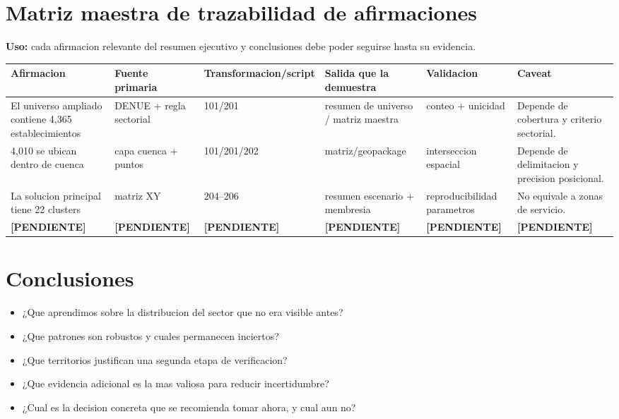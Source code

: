 \documentclass[11pt,letterpaper]{article}
\newcommand{\pendiente}{\textcolor{AtoyacRed}{\textbf{[PENDIENTE]}}}
\begin{document}
\section{Matriz maestra de trazabilidad de afirmaciones}

\textbf{Uso:} cada afirmacion relevante del resumen ejecutivo y conclusiones debe poder seguirse hasta su evidencia.

\begin{landscape}
\small
\begin{longtable}{p{}p{}p{}p{}p{}p{}}
\toprule
\textbf{Afirmacion} & \textbf{Fuente primaria} & \textbf{Transformacion/script} & \textbf{Salida que la demuestra} & \textbf{Validacion} & \textbf{Caveat} \\
\midrule
El universo ampliado contiene 4,365 establecimientos & DENUE + regla sectorial & 101/201 & resumen de universo / matriz maestra & conteo + unicidad & Depende de cobertura y criterio sectorial. \\
4,010 se ubican dentro de cuenca & capa cuenca + puntos & 101/201/202 & matriz/geopackage & interseccion espacial & Depende de delimitacion y precision posicional. \\
La solucion principal tiene 22 clusters & matriz XY & 204--206 & resumen escenario + membresia & reproducibilidad parametros & No equivale a zonas de servicio. \\
\pendiente & \pendiente & \pendiente & \pendiente & \pendiente & \pendiente \\
\bottomrule
\end{longtable}
\normalsize
\end{landscape}

\section{Conclusiones}

\begin{preguntas}
\begin{itemize}
    \item ¿Que aprendimos sobre la distribucion del sector que no era visible antes?
    \item ¿Que patrones son robustos y cuales permanecen inciertos?
    \item ¿Que territorios justifican una segunda etapa de verificacion?
    \item ¿Que evidencia adicional es la mas valiosa para reducir incertidumbre?
    \item ¿Cual es la decision concreta que se recomienda tomar ahora, y cual aun no?
\end{itemize}
\end{preguntas}
\end{document}

